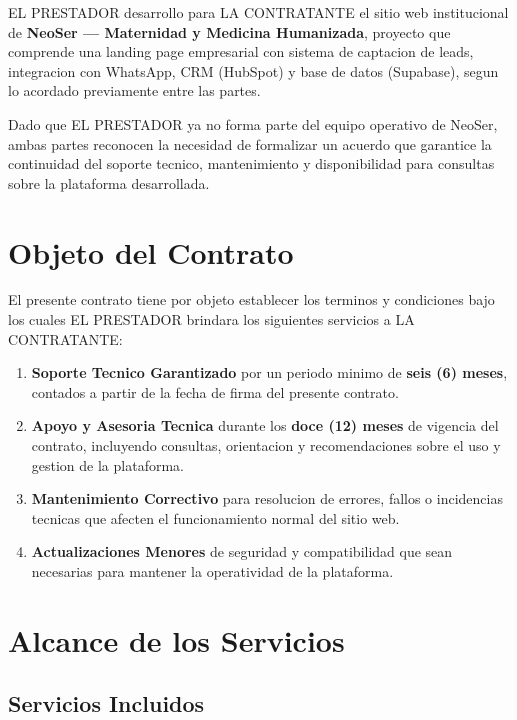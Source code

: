 \documentclass[12pt,a4paper]{article}
\begin{document}
EL PRESTADOR desarrollo para LA CONTRATANTE el sitio web institucional de \textbf{NeoSer --- Maternidad y Medicina Humanizada}, proyecto que comprende una landing page empresarial con sistema de captacion de leads, integracion con WhatsApp, CRM (HubSpot) y base de datos (Supabase), segun lo acordado previamente entre las partes.

Dado que EL PRESTADOR ya no forma parte del equipo operativo de NeoSer, ambas partes reconocen la necesidad de formalizar un acuerdo que garantice la continuidad del soporte tecnico, mantenimiento y disponibilidad para consultas sobre la plataforma desarrollada.

\section{Objeto del Contrato}

El presente contrato tiene por objeto establecer los terminos y condiciones bajo los cuales EL PRESTADOR brindara los siguientes servicios a LA CONTRATANTE:

\begin{enumerate}[label=\textbf{\color{pink}\arabic*.}, leftmargin=2em, itemsep=0.4em]
  \item \textbf{Soporte Tecnico Garantizado} por un periodo minimo de \textbf{seis (6) meses}, contados a partir de la fecha de firma del presente contrato.
  \item \textbf{Apoyo y Asesoria Tecnica} durante los \textbf{doce (12) meses} de vigencia del contrato, incluyendo consultas, orientacion y recomendaciones sobre el uso y gestion de la plataforma.
  \item \textbf{Mantenimiento Correctivo} para resolucion de errores, fallos o incidencias tecnicas que afecten el funcionamiento normal del sitio web.
  \item \textbf{Actualizaciones Menores} de seguridad y compatibilidad que sean necesarias para mantener la operatividad de la plataforma.
\end{enumerate}

\section{Alcance de los Servicios}

\subsection{Servicios Incluidos}
\end{document}
